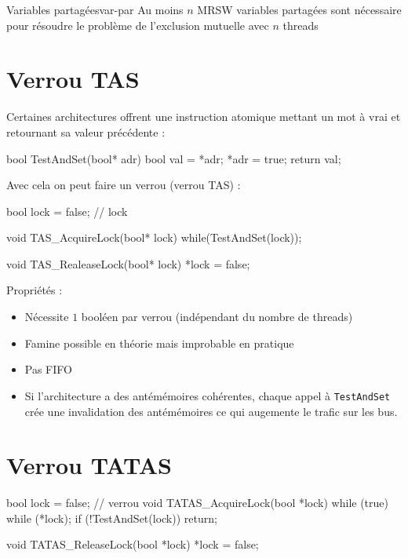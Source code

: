 \documentclass[11pt,a4paper]{report}
\begin{document}
\begin{mytheo}{Variables partagées}{var-par}
    Au moins $n$ MRSW variables partagées sont nécessaire pour résoudre le problème de l'exclusion mutuelle avec $n$ threads
\end{mytheo}


\section{Verrou TAS} %
\label{sec:Verrou TAS}

Certaines architectures offrent une instruction atomique mettant un mot à vrai et retournant sa valeur précédente :

\begin{ccode}
    bool TestAndSet(bool* adr)
    {
        bool val = *adr;
        *adr = true;
        return val;
    }
\end{ccode}

Avec cela on peut faire un verrou (verrou TAS) :

\begin{ccode}
    bool lock = false; // lock

    void TAS_AcquireLock(bool* lock)
    {
        while(TestAndSet(lock));
    }

    void TAS_RealeaseLock(bool* lock)
    {
        *lock = false;
    }
\end{ccode}

Propriétés :
\begin{itemize}
    \item Nécessite $1$ booléen par verrou (indépendant du nombre de threads)
    \item Famine possible en théorie mais improbable en pratique
    \item Pas FIFO
    \item Si l'architecture a des antémémoires cohérentes, chaque appel à \texttt{TestAndSet} crée une invalidation des antémémoires ce qui augemente le trafic sur les bus.
\end{itemize}


\section{Verrou TATAS} %
\label{sec:Verrou TATAS}

\begin{ccode}
    bool lock = false; // verrou
    void TATAS_AcquireLock(bool *lock)
    {
        while (true)
        {
            while (*lock);
            if (!TestAndSet(lock))
                return;
        }
    } 

    void TATAS_ReleaseLock(bool *lock)
    {
        *lock = false;
    } 
\end{ccode}
\end{document}
